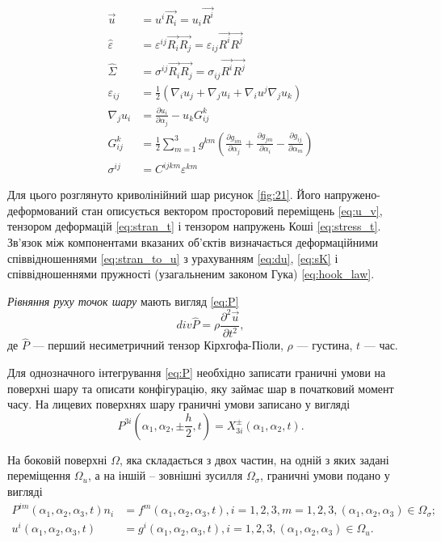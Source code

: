 \documentclass[10pt,a4paper]{article}
\numberwithin{figure}{section}
\numberwithin{equation}{section}
\begin{document}
\begin{align}
\vec{u} &= u^i \vec{R_i}=u_i \vec{R^i} \label{eq:u_v}\\
\hat{\varepsilon} &= \varepsilon^{ij} \vec{R_i}\vec{R_j}=\varepsilon_{ij} \vec{R^i}\vec{R^j} \label{eq:stran_t}\\
\hat{\Sigma} &= \sigma^{ij} \vec{R_i}\vec{R_j}=\sigma_{ij} \vec{R^i}\vec{R^j} \label{eq:stress_t}\\
\varepsilon_{ij} &= \frac{1}{2} \left( \nabla_i u_j + \nabla_j u_i + \nabla_i u^j \nabla_j u_k \right) \label{eq:stran_to_u}\\
\nabla_j u_i &= \frac{ \partial u_i }{ \partial \alpha_j } - u_k G ^k _{ij} \label{eq:du} \\
G ^k _{ij} &= \frac12 \sum_{m=1}^{3} g^{km} 
\left(
\frac{\partial g_{im}}{\partial \alpha_j} + \frac{\partial g_{jm}}{\partial \alpha_i} - \frac{\partial g_{ij}}{\partial \alpha_m} 
\right) \label{eq:sK} \\
\sigma^{ij} &= C^{ijkm}\varepsilon^{km} \label{eq:hook_law}
\end{align}

Для цього розглянуто криволінійний шар рисунок \ref{fig:21}. Його напружено-деформований стан описується вектором просторовий переміщень \eqref{eq:u_v}, тензором деформацій \eqref{eq:stran_t} і тензором напружень Коші \eqref{eq:stress_t}. Зв’язок між компонентами вказаних об’єктів визначається деформаційними співвідношеннями \eqref{eq:stran_to_u} з урахуванням \eqref{eq:du}, \eqref{eq:sK} і співвідношеннями пружності (узагальненим законом Гука) \eqref{eq:hook_law}.

\emph{Рівняння руху точок шару} мають вигляд \eqref{eq:P}
\begin{equation} \label{eq:P}
div \hat{P} = \rho \frac{\partial^2 \vec{u}}{\partial t^2},
\end{equation}
де $\hat{P}$ --- перший несиметричний тензор Кірхгофа-Піоли, $\rho$ --- густина, $t$ --- час.

\medskip
Для однозначного інтегрування  \eqref{eq:P} необхідно записати граничні умови на поверхні шару та описати конфігурацію, яку займає шар в початковий момент часу. На лицевих поверхнях шару граничні умови записано у вигляді 
\begin{equation}
P^{3i}\left( \alpha_1, \alpha_2, \pm \frac{h}{2}, t \right) = X^{\pm}_{3i}\left( \alpha_1, \alpha_2, t \right).
\end{equation}

\medskip
На боковій поверхні $\Omega$, яка складається з двох частин, на одній з яких задані переміщення $\Omega_{u} $, а на іншій – зовнішні зусилля $\Omega_{\sigma} $, граничні умови подано у вигляді  
\begin{align}
P^{im}\left( \alpha_1, \alpha_2, \alpha_3, t \right)n_i &= f^{m}\left( \alpha_1, \alpha_2, \alpha_3, t \right), i=1,2,3, m=1,2,3, \left( \alpha_1, \alpha_2,\alpha_3\right)\in\Omega_{\sigma};\\
u^{i}\left( \alpha_1, \alpha_2, \alpha_3, t \right) &=g^{i}\left( \alpha_1, \alpha_2, \alpha_3, t \right), i=1,2,3, \left( \alpha_1, \alpha_2,\alpha_3\right)\in\Omega_{u}.
\end{align}
\end{document}
